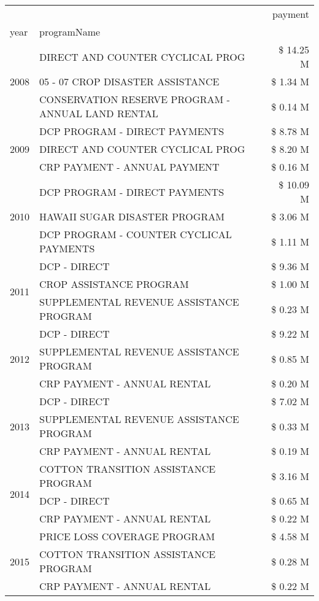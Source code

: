 \begin{tabular}{llr}
\toprule
 &  & payment \\
year & programName &  \\
\midrule
\multirow[t]{3}{*}{2008} & DIRECT AND COUNTER CYCLICAL PROG & \$ 14.25 M \\
 & 05 - 07 CROP DISASTER ASSISTANCE & \$ 1.34 M \\
 & CONSERVATION RESERVE PROGRAM - ANNUAL LAND RENTAL & \$ 0.14 M \\
\cline{1-3}
\multirow[t]{3}{*}{2009} & DCP PROGRAM - DIRECT PAYMENTS & \$ 8.78 M \\
 & DIRECT AND COUNTER CYCLICAL PROG & \$ 8.20 M \\
 & CRP PAYMENT - ANNUAL PAYMENT & \$ 0.16 M \\
\cline{1-3}
\multirow[t]{3}{*}{2010} & DCP PROGRAM - DIRECT PAYMENTS & \$ 10.09 M \\
 & HAWAII SUGAR DISASTER PROGRAM & \$ 3.06 M \\
 & DCP PROGRAM - COUNTER CYCLICAL PAYMENTS & \$ 1.11 M \\
\cline{1-3}
\multirow[t]{3}{*}{2011} & DCP - DIRECT & \$ 9.36 M \\
 & CROP ASSISTANCE PROGRAM & \$ 1.00 M \\
 & SUPPLEMENTAL REVENUE ASSISTANCE PROGRAM & \$ 0.23 M \\
\cline{1-3}
\multirow[t]{3}{*}{2012} & DCP - DIRECT & \$ 9.22 M \\
 & SUPPLEMENTAL REVENUE ASSISTANCE PROGRAM & \$ 0.85 M \\
 & CRP PAYMENT - ANNUAL RENTAL & \$ 0.20 M \\
\cline{1-3}
\multirow[t]{3}{*}{2013} & DCP - DIRECT & \$ 7.02 M \\
 & SUPPLEMENTAL REVENUE ASSISTANCE PROGRAM & \$ 0.33 M \\
 & CRP PAYMENT - ANNUAL RENTAL & \$ 0.19 M \\
\cline{1-3}
\multirow[t]{3}{*}{2014} & COTTON TRANSITION ASSISTANCE PROGRAM & \$ 3.16 M \\
 & DCP - DIRECT & \$ 0.65 M \\
 & CRP PAYMENT - ANNUAL RENTAL & \$ 0.22 M \\
\cline{1-3}
\multirow[t]{3}{*}{2015} & PRICE LOSS COVERAGE PROGRAM & \$ 4.58 M \\
 & COTTON TRANSITION ASSISTANCE PROGRAM & \$ 0.28 M \\
 & CRP PAYMENT - ANNUAL RENTAL & \$ 0.22 M \\
\cline{1-3}

\end{tabular}
